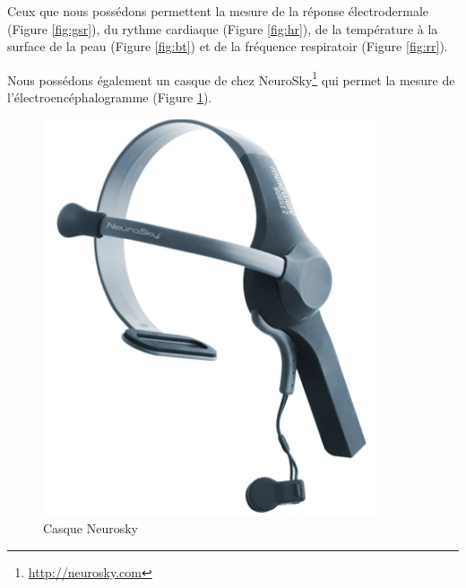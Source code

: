 \documentclass{article}
\begin{document}
			Ceux que nous possédons permettent la mesure de la réponse électrodermale (Figure \ref{fig:gsr}), du rythme cardiaque (Figure \ref{fig:hr}), de la température à la surface de la peau (Figure \ref{fig:bt}) et de la fréquence respiratoir (Figure \ref{fig:rr}).\par
			Nous possédons également un casque de chez NeuroSky\footnote{\href{http://neurosky.com}{http://neurosky.com}} qui permet la mesure de l'électroencéphalogramme (Figure \ref{fig:neurosky}).
			\begin{figure}
				\centering
				\includegraphics[scale=0.5]{../include/neurosky.PNG}
				\caption{Casque Neurosky}
				\label{fig:neurosky}
			\end{figure}
\end{document}
